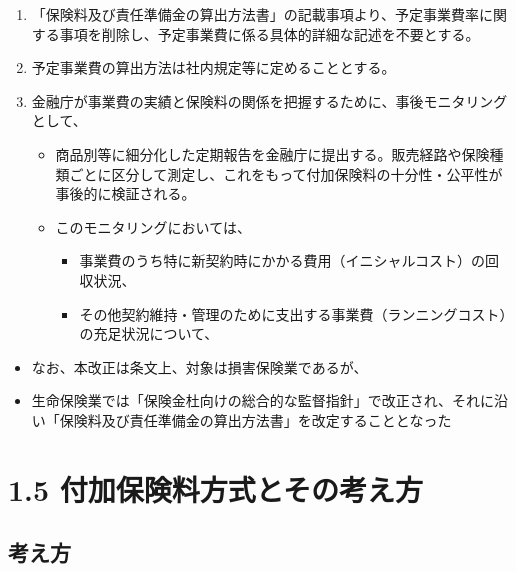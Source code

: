 \documentclass[
]{article}
\providecommand{\tightlist}{%
  \setlength{\itemsep}{0pt}\setlength{\parskip}{0pt}}
\begin{document}
\begin{enumerate}
\def\labelenumi{\arabic{enumi}.}
\tightlist
\item
  「保険料及び責任準備金の算出方法書」の記載事項より、予定事業費率に関する事項を削除し、予定事業費に係る具体的詳細な記述を不要とする。
\item
  予定事業費の算出方法は社内規定等に定めることとする。
\item
  金融庁が事業費の実績と保険料の関係を把握するために、事後モニタリングとして、

  \begin{itemize}
  \tightlist
  \item
    商品別等に細分化した定期報告を金融庁に提出する。販売経路や保険種類ごとに区分して測定し、これをもって付加保険料の十分性・公平性が事後的に検証される。
  \item
    このモニタリングにおいては、

    \begin{itemize}
    \tightlist
    \item
      事業費のうち特に新契約時にかかる費用（イニシャルコスト）の回収状況、
    \item
      その他契約維持・管理のために支出する事業費（ランニングコスト）の充足状況について、
    \end{itemize}
  \end{itemize}
\end{enumerate}

\begin{itemize}
\tightlist
\item
  なお、本改正は条文上、対象は損害保険業であるが、
\item
  生命保険業では「保険金杜向けの総合的な監督指針」で改正され、それに沿い「保険料及び責任準備金の算出方法書」を改定することとなった
\end{itemize}

\hypertarget{ux4ed8ux52a0ux4fddux967aux6599ux65b9ux5f0fux3068ux305dux306eux8003ux3048ux65b9}{%
\section{1.5
付加保険料方式とその考え方}\label{ux4ed8ux52a0ux4fddux967aux6599ux65b9ux5f0fux3068ux305dux306eux8003ux3048ux65b9}}

\hypertarget{ux8003ux3048ux65b9}{%
\subsection{考え方}\label{ux8003ux3048ux65b9}}
\end{document}
